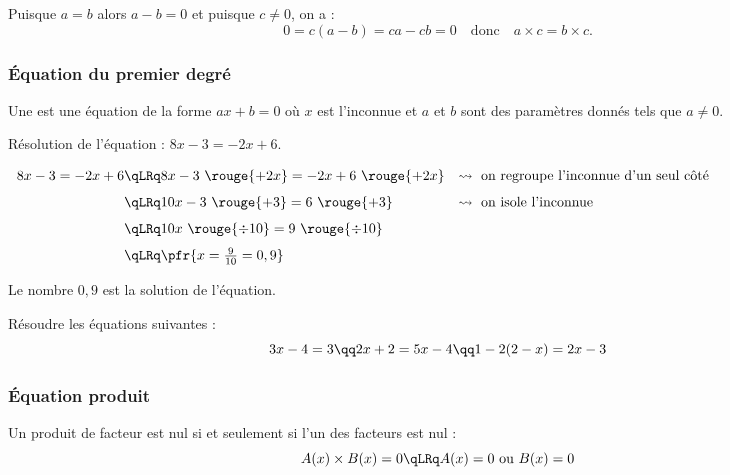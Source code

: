 \documentclass[10pt,openright,twoside,french]{book}
\begin{document}
\begin{Demo}
    Puisque $a = b$ alors $a - b = 0$ et puisque $c \neq 0$, on a :
    \[0 = c(a - b) = ca - cb = 0 \quad \text{donc} \quad a \times c = b \times c.\]
\end{Demo}

\subsubsection{\'Equation du premier degré}
\begin{Defi}
    Une  est une équation de la forme $ax + b = 0$ où $x$ est l'inconnue et $a$ et $b$ sont des paramètres donnés tels que $a \neq 0$.\par
\end{Defi}

\begin{Exemple}
    Résolution de l'équation : $8x - 3 = -2x + 6$.\par\smallskip
    $\begin{array}{r@{\qLRq}ll}
        8x - 3 = -2x + 6 & 8x - 3 ~\rouge{+2x} = -2x + 6 ~\rouge{+2x} & \rightsquigarrow\ \text{on regroupe l'inconnue d'un seul côté} \\[7pt]
         &   10x - 3 ~\rouge{+3} = 6 ~\rouge{+3} &\rightsquigarrow\ \text{on isole l'inconnue} \\[7pt]
        & 10x ~\rouge{\div 10} = 9 ~\rouge{\div 10} & \\[7pt]
        & \pfr{x = \frac{9}{10} = 0,9} &
    \end{array}$\medskip

    Le nombre $0,9$ est la solution de l'équation.
\end{Exemple}\medskip

\begin{Exemple}[s]
    Résoudre les équations suivantes :
    \[3x - 4 = 3 \qq 2x + 2 = 5x - 4 \qq 1 - 2(2 - x) = 2x - 3\]
\end{Exemple}

\subsubsection{\'Equation produit}
\begin{Prop}[(admise)]
    Un produit de facteur est nul si et seulement si l'un des facteurs est nul :
    \[A(x) \times B(x) = 0 \qLRq A(x) = 0 \text{ ou } B(x) = 0\]
\end{Prop}\clearpage
\end{document}
